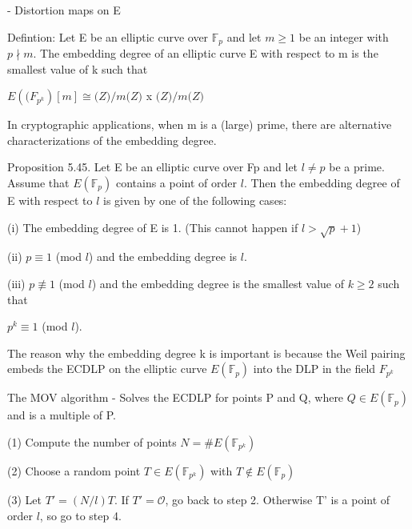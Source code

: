 \documentclass[titlepage]{article}
\begin{document}
\hspace{\parindent}- Distortion maps on E 

Defintion: Let E be an elliptic curve over $\mathbb{F}_p$ and let $m \geq 1$ be an integer with  $p \nmid m$. The embedding degree of an elliptic curve E with respect to m is the smallest value of k such that 

\begin{center} 
$E(\mathbb(F_{p^k})[m] \cong \mathbb(Z)/m\mathbb(Z)$ x $\mathbb(Z)/m\mathbb(Z)$
\end{center} 

In cryptographic applications, when m is a (large) prime, there are alternative characterizations of the embedding degree. 

Proposition 5.45. Let E be an elliptic curve over Fp and let $l \neq p$ be a prime. Assume that $E(\mathbb{F}_p)$ contains a point of order $l$. Then the embedding degree of E with respect to $l$ is given by one of the following cases:


\hspace{\parindent}(i) The embedding degree of E is 1. (This cannot happen if $l > \sqrt{p} + 1$)

\hspace{\parindent}(ii) $p \equiv 1$ (mod $l$) and the embedding degree is $l$.

\hspace{\parindent}(iii) $p \not\equiv 1$ (mod $l$) and the embedding degree is the smallest value of $k \geq 2$ such that
\begin{center} 
$p^k \equiv 1$ (mod $l$).
\end{center} 

The reason why the embedding degree k is important is because the Weil pairing embeds the ECDLP on the elliptic curve $E(\mathbb{F}_p)$ into the DLP in the field $F_{p^k}$

The MOV algorithm - Solves the ECDLP for points P and Q, where $Q \in E(\mathbb{F}_p)$ and is a multiple of P. 


 
\hspace{\parindent}(1) Compute the number of points $N = \#E(\mathbb{F}_{p^k})$

\hspace{\parindent}(2) Choose a random point $T \in E(\mathbb{F}_{p^k})$ with $T \not\in E(\mathbb{F}_{p})$

\hspace{\parindent}(3) Let $T' = (N/l)T$. If $T' = \mathcal{O}$, go back to step 2. Otherwise T' is a point of order $l$, so go to step 4.  
\end{document}
